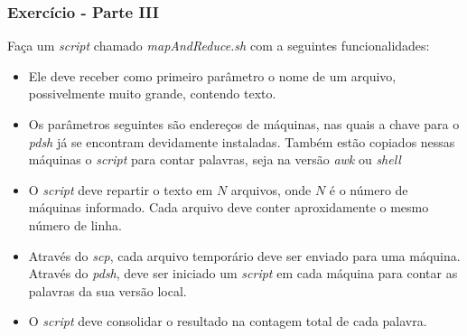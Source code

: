 \documentclass{beamer}
\begin{document}
   \begin{frame}
      \frametitle{Exercício - Parte III}
      Faça um \textit{script} chamado \textit{mapAndReduce.sh} com a seguintes funcionalidades:
      \begin{itemize}
         \item Ele deve receber como primeiro parâmetro o nome de um arquivo, possivelmente muito grande, contendo texto.
	 \item Os parâmetros seguintes são endereços de máquinas, nas quais a chave para o \textit{pdsh} já se encontram devidamente instaladas. Também estão copiados nessas máquinas o \textit{script} para contar palavras, seja na versão \textit{awk} ou \textit{shell}
	 \item O \textit{script} deve repartir o texto em $N$ arquivos, onde $N$ é o número de máquinas informado. Cada arquivo deve conter aproxidamente o mesmo número de linha. 
	 \item Através do \textit{scp}, cada arquivo temporário deve ser enviado para uma máquina. Através do \textit{pdsh}, deve ser iniciado um \textit{script} em cada máquina para contar as palavras da sua versão local.
	 \item O \textit{script} deve consolidar o resultado na contagem total de cada palavra.
      \end{itemize}
   \end{frame}
\end{document}
